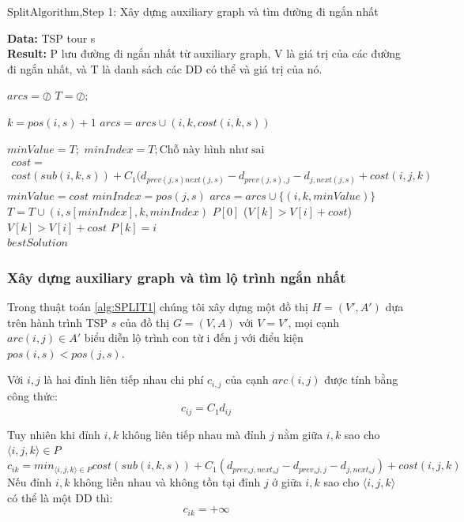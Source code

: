 \documentclass[a4paper,12pt]{report}
\begin{document}
\begin{algorithm}[H]
\caption{$\text{SplitAlgorithm}$,Step 1: Xây dựng auxiliary graph và tìm đường đi ngắn nhất}
\textbf{Data:} TSP tour s\\
\textbf{Result:} P lưu đường đi ngắn nhất từ auxiliary graph, V là giá trị của các đường đi ngắn nhất, và T là danh sách các DD có thể và giá trị của nó.
\begin{algorithmic}[1]
\State $arcs=\oslash$
\State $T=\oslash;$

\State $k=pos(i,s)+1$
\State $arcs=arcs \cup (i,k,cost(i,k,s)) $
\EndFor
{}

\State $minValue=T;$
\State $minIndex=T;\text{Chỗ này hình như sai}$
\State $\begin{array}{l}cost = \\ cost(sub(i,k,s))+C_1(d_{prev(j,s)next(j,s)}-d_{prev(j,s),j}-d_{j,next(j,s)}+cost(i,j,k) \end{array}$
\State $minValue=cost$
\State $minIndex=pos(j,s)$
\EndIf
\EndIf
\EndFor
\State $arcs=arcs \cup \{(i,k,minValue)\}$
\State $T=T\cup{(i,s[minIndex],k,minIndex)}$
\EndIf
\EndFor
\EndFor
\State $P[0]$
\If($V[k] > V[i]+cost$)
\State $V[k]>V[i]+cost$
\State $P[k]=i$
\EndIf
\EndFor
\EndFor\\
\Return $bestSolution$
\end{algorithmic}
\label{alg:SPLIT1}
\end{algorithm}
\subsubsection{Xây dựng auxiliary graph và tìm lộ trình ngắn nhất}
Trong thuật toán \ref{alg:SPLIT1} chúng tôi xây dựng một đồ thị $H=(V',A')$ dựa trên hành trình TSP $s$ của đồ thị $G=(V,A)$ với $V=V'$, mọi cạnh $arc(i,j) \in A'$ biểu diễn lộ trình con từ i đến j với điểu kiện $pos(i,s)<pos(j,s)$.

Với $i,j$ là hai đỉnh liên tiếp nhau chi phí $c_{i,j}$ của cạnh $arc(i,j)$ được tính bằng công thức:
$$c_{ij}=C_1d_{ij}$$ 

Tuy nhiên khi đỉnh $i,k$ không liên tiếp nhau mà đỉnh $j$ nằm giữa $i,k$ sao cho $\langle i,j,k \rangle \in P$
$$
c_{ik}=min_{\langle i,j,k \rangle \in P} cost(sub(i,k,s))+C_1(d_{prev_sj,next_sj}-d_{prev_sj,j}-d_{j,next_sj})+cost(i,j,k)
$$
Nếu đỉnh $i,k$ không liền nhau và không tồn tại đỉnh $j$ ở giữa $i,k$ sao cho $\langle i,j,k \rangle$ có thể là một DD thì:
$$c_{ik}=+\infty$$
\end{document}
